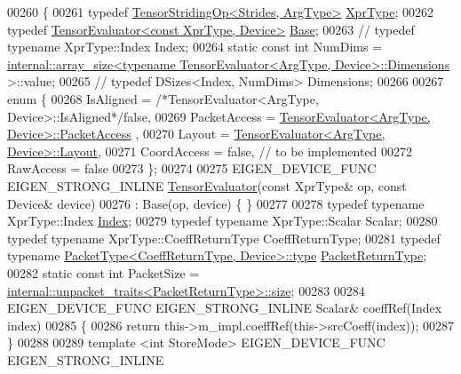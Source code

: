 \begin{DoxyCode}
00260 \{
00261   \textcolor{keyword}{typedef} \hyperlink{class_eigen_1_1_tensor_striding_op}{TensorStridingOp<Strides, ArgType>} 
      \hyperlink{class_eigen_1_1_tensor_striding_op}{XprType};
00262   \textcolor{keyword}{typedef} \hyperlink{struct_eigen_1_1_tensor_evaluator}{TensorEvaluator<const XprType, Device>} 
      \hyperlink{struct_eigen_1_1_tensor_evaluator}{Base};
00263   \textcolor{comment}{//  typedef typename XprType::Index Index;}
00264   \textcolor{keyword}{static} \textcolor{keyword}{const} \textcolor{keywordtype}{int} NumDims = 
      \hyperlink{struct_eigen_1_1internal_1_1array__size}{internal::array\_size<typename TensorEvaluator<ArgType, Device>::Dimensions}
      >::value;
00265   \textcolor{comment}{//  typedef DSizes<Index, NumDims> Dimensions;}
00266 
00267   \textcolor{keyword}{enum} \{
00268     IsAligned = \textcolor{comment}{/*TensorEvaluator<ArgType, Device>::IsAligned*/}\textcolor{keyword}{false},
00269     PacketAccess = \hyperlink{struct_eigen_1_1_tensor_evaluator}{TensorEvaluator<ArgType, Device>::PacketAccess}
      ,
00270     Layout = \hyperlink{struct_eigen_1_1_tensor_evaluator}{TensorEvaluator<ArgType, Device>::Layout},
00271     CoordAccess = \textcolor{keyword}{false},  \textcolor{comment}{// to be implemented}
00272     RawAccess = \textcolor{keyword}{false}
00273   \};
00274 
00275   EIGEN\_DEVICE\_FUNC EIGEN\_STRONG\_INLINE \hyperlink{struct_eigen_1_1_tensor_evaluator}{TensorEvaluator}(\textcolor{keyword}{const} XprType& op, \textcolor{keyword}{const} Device& 
      device)
00276       : Base(op, device) \{ \}
00277 
00278   \textcolor{keyword}{typedef} \textcolor{keyword}{typename} XprType::Index \hyperlink{namespace_eigen_a62e77e0933482dafde8fe197d9a2cfde}{Index};
00279   \textcolor{keyword}{typedef} \textcolor{keyword}{typename} XprType::Scalar Scalar;
00280   \textcolor{keyword}{typedef} \textcolor{keyword}{typename} XprType::CoeffReturnType CoeffReturnType;
00281   \textcolor{keyword}{typedef} \textcolor{keyword}{typename} \hyperlink{group___sparse_core___module}{PacketType<CoeffReturnType, Device>::type} 
      \hyperlink{group___sparse_core___module}{PacketReturnType};
00282   \textcolor{keyword}{static} \textcolor{keyword}{const} \textcolor{keywordtype}{int} PacketSize = 
      \hyperlink{struct_eigen_1_1internal_1_1unpacket__traits}{internal::unpacket\_traits<PacketReturnType>::size};
00283 
00284   EIGEN\_DEVICE\_FUNC EIGEN\_STRONG\_INLINE Scalar& coeffRef(Index index)
00285   \{
00286     \textcolor{keywordflow}{return} this->m\_impl.coeffRef(this->srcCoeff(index));
00287   \}
00288 
00289   \textcolor{keyword}{template} <\textcolor{keywordtype}{int} StoreMode> EIGEN\_DEVICE\_FUNC EIGEN\_STRONG\_INLINE

\end{DoxyCode}
